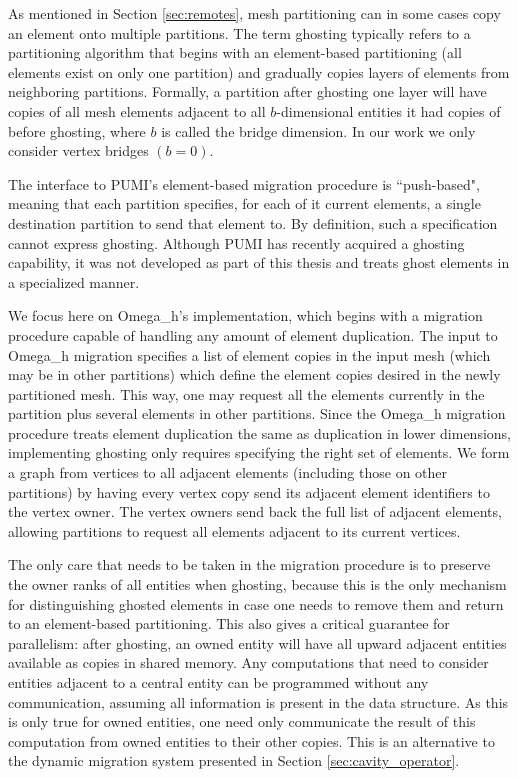 As mentioned in Section \ref{sec:remotes}, mesh partitioning can
in some cases copy an element onto multiple partitions.
The term ghosting typically refers to a partitioning algorithm
that begins with an element-based partitioning (all elements
exist on only one partition) and gradually copies layers of elements
from neighboring partitions.
Formally, a partition after ghosting one layer will have copies
of all mesh elements adjacent to all $b$-dimensional entities
it had copies of before ghosting, where $b$ is called the bridge dimension.
In our work we only consider vertex bridges $(b=0)$.

The interface to PUMI's element-based migration procedure is
``push-based", meaning that each partition specifies, for each
of it current elements, a single destination partition to send
that element to.
By definition, such a specification cannot express ghosting.
Although PUMI has recently acquired a ghosting capability, it was
not developed as part of this thesis and treats ghost elements
in a specialized manner.

We focus here on Omega\_h's implementation, which begins with
a migration procedure capable of handling any amount of element duplication.
The input to Omega\_h migration specifies a list of element copies
in the input mesh (which may be in other partitions) which define
the element copies desired in the newly partitioned mesh.
This way, one may request all the elements currently in the
partition plus several elements in other partitions.
Since the Omega\_h migration procedure treats element duplication
the same as duplication in lower dimensions, implementing ghosting
only requires specifying the right set of elements.
We form a graph from vertices to all adjacent elements (including
those on other partitions) by having every vertex copy send its
adjacent element identifiers to the vertex owner.
The vertex owners send back the full list of adjacent elements,
allowing partitions to request all elements adjacent to its current
vertices.

The only care that needs to be taken in the migration procedure
is to preserve the owner ranks of all entities when ghosting,
because this is the only mechanism for distinguishing ghosted
elements in case one needs to remove them and return to
an element-based partitioning.
This also gives a critical guarantee for parallelism:
after ghosting, an owned entity will have all upward adjacent
entities available as copies in shared memory.
Any computations that need to consider entities adjacent to
a central entity can be programmed without any communication,
assuming all information is present in the data structure.
As this is only true for owned entities, one need only communicate
the result of this computation from owned entities to their other
copies.
This is an alternative to the dynamic migration system
presented in Section \ref{sec:cavity_operator}.

